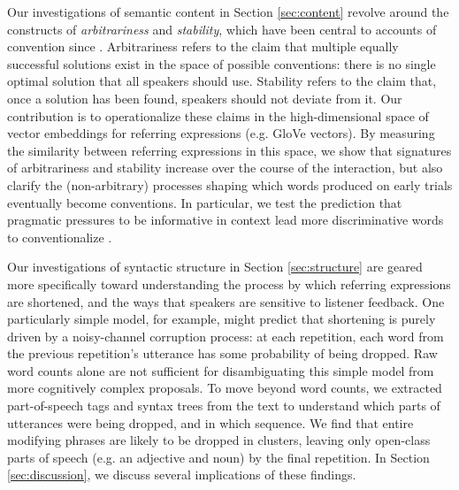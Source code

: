 \documentclass[alpha-refs]{wiley-article}
\begin{document}
Our investigations of semantic content in Section \ref{sec:content} revolve around the constructs of \emph{arbitrariness} and \emph{stability}, which have been central to accounts of convention since \cite{Lewis69_Convention}.
Arbitrariness refers to the claim that multiple equally successful solutions exist in the space of possible conventions: there is no single optimal solution that all speakers should use.
Stability refers to the claim that, once a solution has been found, speakers should not deviate from it.
Our contribution is to operationalize these claims in the high-dimensional space of vector embeddings for referring expressions (e.g. GloVe vectors).
By measuring the similarity between referring expressions in this space, we show that signatures of arbitrariness and stability increase over the course of the interaction, but also clarify the (non-arbitrary) processes shaping which words produced on early trials eventually become conventions.
In particular, we test the prediction that pragmatic pressures to be informative in context lead more discriminative words to conventionalize \citep{KirbyTamarizCornishSmith15_CompressionCommunication,GibsonEtAl17_ColorNamingUse,hawkins_emerging_abstractions_2018}. %


Our investigations of syntactic structure in Section \ref{sec:structure} are geared more specifically toward understanding the process by which referring expressions are shortened, and the ways that speakers are sensitive to listener feedback.
One particularly simple model, for example, might predict that shortening is purely driven by a noisy-channel corruption process: at each repetition, each word from the previous repetition's utterance has some probability of being dropped.
Raw word counts alone are not sufficient for disambiguating this simple model from more cognitively complex proposals.
To move beyond word counts, we extracted part-of-speech tags and syntax trees from the text to understand which parts of utterances were being dropped, and in which sequence.
We find that entire modifying phrases are likely to be dropped in clusters, leaving only open-class parts of speech (e.g. an adjective and noun) by the final repetition. 
In Section \ref{sec:discussion}, we discuss several implications of these findings.
\end{document}
